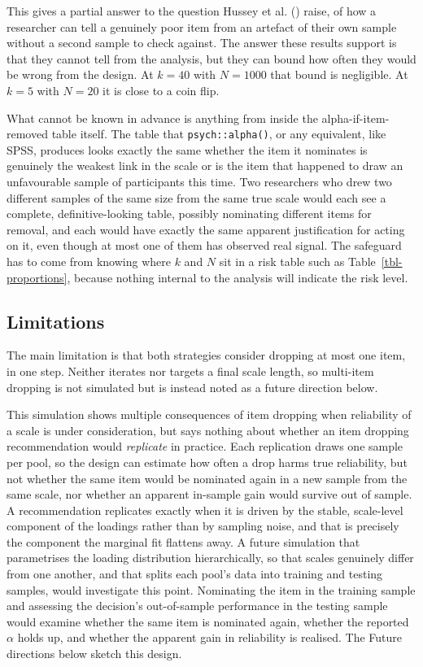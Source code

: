 \documentclass[
  nonatbib,
  authoryear,
  preprint]{elsarticle}
\begin{document}
This gives a partial answer to the question Hussey et al.
() raise, of how a researcher
can tell a genuinely poor item from an artefact of their own sample
without a second sample to check against. The answer these results
support is that they cannot tell from the analysis, but they can bound
how often they would be wrong from the design. At \(k = 40\) with
\(N = 1000\) that bound is negligible. At \(k = 5\) with \(N = 20\) it
is close to a coin flip.

What cannot be known in advance is anything from inside the
alpha-if-item-removed table itself. The table that
\texttt{psych::alpha()}, or any equivalent, like SPSS, produces looks
exactly the same whether the item it nominates is genuinely the weakest
link in the scale or is the item that happened to draw an unfavourable
sample of participants this time. Two researchers who drew two different
samples of the same size from the same true scale would each see a
complete, definitive-looking table, possibly nominating different items
for removal, and each would have exactly the same apparent justification
for acting on it, even though at most one of them has observed real
signal. The safeguard has to come from knowing where \(k\) and \(N\) sit
in a risk table such as Table~\ref{tbl-proportions}, because nothing
internal to the analysis will indicate the risk level.

\subsection{Limitations}\label{limitations}

The main limitation is that both strategies consider dropping at most
one item, in one step. Neither iterates nor targets a final scale
length, so multi-item dropping is not simulated but is instead noted as
a future direction below.

This simulation shows multiple consequences of item dropping when
reliability of a scale is under consideration, but says nothing about
whether an item dropping recommendation would \emph{replicate} in
practice. Each replication draws one sample per pool, so the design can
estimate how often a drop harms true reliability, but not whether the
same item would be nominated again in a new sample from the same scale,
nor whether an apparent in-sample gain would survive out of sample. A
recommendation replicates exactly when it is driven by the stable,
scale-level component of the loadings rather than by sampling noise, and
that is precisely the component the marginal fit flattens away. A future
simulation that parametrises the loading distribution hierarchically, so
that scales genuinely differ from one another, and that splits each
pool's data into training and testing samples, would investigate this
point. Nominating the item in the training sample and assessing the
decision's out-of-sample performance in the testing sample would examine
whether the same item is nominated again, whether the reported
\(\alpha\) holds up, and whether the apparent gain in reliability is
realised. The Future directions below sketch this design.
\end{document}
